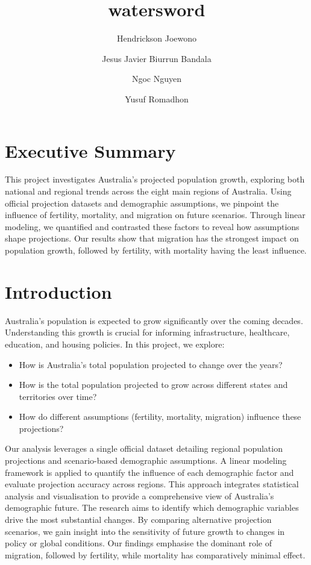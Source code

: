 \documentclass[
  11pt,
]{article}
\title{watersword}
\author{Hendrickson Joewono \and Jesus Javier Biurrun Bandala \and Ngoc
Nguyen \and Yusuf Romadhon}
\date{}
\renewcommand*\contentsname{Table of contents}
\newcommand\contentsname{Table of contents}
\begin{document}
\maketitle

\renewcommand*\contentsname{Table of contents}
{
\hypersetup{linkcolor=}
\setcounter{tocdepth}{2}
\tableofcontents
}

\newpage

\section{Executive Summary}\label{executive-summary}

This project investigates Australia's projected population growth,
exploring both national and regional trends across the eight main
regions of Australia. Using official projection datasets and demographic
assumptions, we pinpoint the influence of fertility, mortality, and
migration on future scenarios. Through linear modeling, we quantified
and contrasted these factors to reveal how assumptions shape
projections. Our results show that migration has the strongest impact on
population growth, followed by fertility, with mortality having the
least influence.

\section{Introduction}\label{introduction}

Australia's population is expected to grow significantly over the coming
decades. Understanding this growth is crucial for informing
infrastructure, healthcare, education, and housing policies. In this
project, we explore:

\begin{itemize}
\item
  How is Australia's total population projected to change over the
  years?
\item
  How is the total population projected to grow across different states
  and territories over time?
\item
  How do different assumptions (fertility, mortality, migration)
  influence these projections?
\end{itemize}

Our analysis leverages a single official dataset detailing regional
population projections and scenario-based demographic assumptions. A
linear modeling framework is applied to quantify the influence of each
demographic factor and evaluate projection accuracy across regions. This
approach integrates statistical analysis and visualisation to provide a
comprehensive view of Australia's demographic future. The research aims
to identify which demographic variables drive the most substantial
changes. By comparing alternative projection scenarios, we gain insight
into the sensitivity of future growth to changes in policy or global
conditions. Our findings emphasise the dominant role of migration,
followed by fertility, while mortality has comparatively minimal effect.
\end{document}
